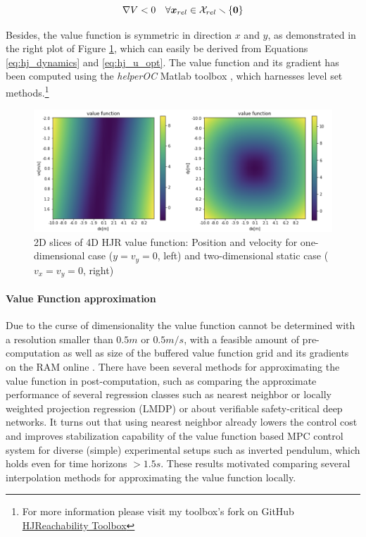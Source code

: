\begin{equation}
\nabla V < 0 \quad \forall \boldsymbol{x}_{rel} \in \mathcal{X}_{rel} \smallsetminus \{ \boldsymbol{0} \}
\label{eq:hj_value_negative}
\end{equation}

Besides, the value function is symmetric in direction $x$ and $y$, as demonstrated in the right plot of Figure \ref{img:hj_value_function}, which can easily be derived from Equations \ref{eq:hj_dynamics} and \ref{eq:hj_u_opt}. The value function and its gradient has been computed using the \textit{helperOC} Matlab toolbox \cite{Bansal2017}, which harnesses level set methods.\footnote{For more information please visit my toolbox's fork on GitHub \href{https://github.com/simon-schaefer/HJReachibility}{HJReachability Toolbox}}

\begin{figure}[!ht]
\begin{center}
\includegraphics[width=\imgwidth]{images/hj_value_function.png}
\caption{2D slices of 4D \ac{HJR} value function: Position and velocity for one-dimensional case ($y = v_y = 0$, left) and two-dimensional static case ($v_x = v_y = 0$, right)}
\label{img:hj_value_function}
\end{center}
\end{figure}

\paragraph{Value Function approximation}
Due to the curse of dimensionality the value function cannot be determined with a resolution smaller than $0.5 m$ or $0.5 m/s$, with a feasible amount of pre-computation as well as size of the buffered value function grid and its gradients  on the RAM online \cite{Pavone2020}. There have been several methods for  approximating the value function in post-computation, such as \cite{Zhong2013} comparing the approximate performance of several regression classes such as nearest neighbor or locally weighted projection regression (LMDP) or \cite{Kuper2018} about verifiable safety-critical deep networks. It turns out that using nearest neighbor already lowers the control cost and improves stabilization capability of the value function based MPC control system for diverse (simple) experimental setups such as inverted pendulum, which holds even for time horizons $> 1.5s$. These results motivated comparing several interpolation methods for approximating the value function locally.

